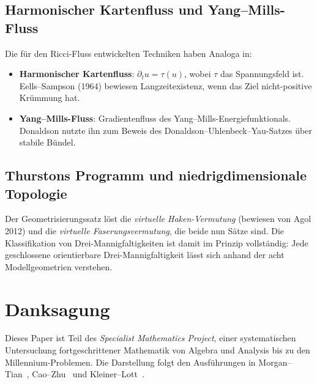 \documentclass[12pt,a4paper]{amsart}
\theoremstyle{definition}
\theoremstyle{remark}
\begin{document}
\subsection{Harmonischer Kartenfluss und Yang--Mills-Fluss}

Die für den Ricci-Fluss entwickelten Techniken haben Analoga in:
\begin{itemize}
  \item \textbf{Harmonischer Kartenfluss}: $\partial_t u = \tau(u)$, wobei
    $\tau$ das Spannungsfeld ist.  Eells--Sampson (1964) bewiesen
    Langzeitexistenz, wenn das Ziel nicht-positive Krümmung hat.
  \item \textbf{Yang--Mills-Fluss}: Gradientenfluss des Yang--Mills-Energie\-funktionals.
    Donaldson nutzte ihn zum Beweis des Donaldson--Uhlenbeck--Yau-Satzes über
    stabile Bündel.
\end{itemize}

\subsection{Thurstons Programm und niedrigdimensionale Topologie}

Der Geometrisierungssatz löst die \emph{virtuelle Haken-Vermutung} (bewiesen
von Agol 2012) und die \emph{virtuelle Faserungsvermutung}, die beide nun
Sätze sind.  Die Klassifikation von Drei-Mannigfaltigkeiten ist damit
im Prinzip vollständig: Jede geschlossene orientierbare Drei-Mannigfaltigkeit
lässt sich anhand der acht Modellgeometrien verstehen.


\section*{Danksagung}

Dieses Paper ist Teil des \emph{Specialist Mathematics Project}, einer
systematischen Untersuchung fortgeschrittener Mathematik von Algebra und
Analysis bis zu den Millennium-Problemen.  Die Darstellung folgt den
Ausführungen in Morgan--Tian~\cite{MorganTian2007},
Cao--Zhu~\cite{CaoZhu2006} und Kleiner--Lott~\cite{KleinerLott2008}.
\end{document}
